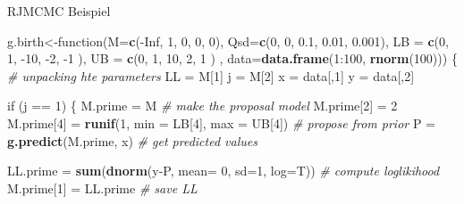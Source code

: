 \documentclass[ignorenonframetext,]{beamer}
\newenvironment{Shaded}{\begin{snugshade}}{\end{snugshade}}
\newcommand{\KeywordTok}[1]{\textcolor[rgb]{0.13,0.29,0.53}{\textbf{{#1}}}}
\newcommand{\DataTypeTok}[1]{\textcolor[rgb]{0.13,0.29,0.53}{{#1}}}
\newcommand{\DecValTok}[1]{\textcolor[rgb]{0.00,0.00,0.81}{{#1}}}
\newcommand{\FloatTok}[1]{\textcolor[rgb]{0.00,0.00,0.81}{{#1}}}
\newcommand{\StringTok}[1]{\textcolor[rgb]{0.31,0.60,0.02}{{#1}}}
\newcommand{\CommentTok}[1]{\textcolor[rgb]{0.56,0.35,0.01}{\textit{{#1}}}}
\newcommand{\OtherTok}[1]{\textcolor[rgb]{0.56,0.35,0.01}{{#1}}}
\newcommand{\NormalTok}[1]{{#1}}
\begin{document}
\begin{frame}{RJMCMC Beispiel}
\begin{Shaded}
\begin{Highlighting}[]
\NormalTok{g.birth<-function(}\DataTypeTok{M=}\KeywordTok{c}\NormalTok{(-}\OtherTok{Inf}\NormalTok{, }\DecValTok{1}\NormalTok{, }\DecValTok{0}\NormalTok{, }\DecValTok{0}\NormalTok{, }\DecValTok{0}\NormalTok{), }\DataTypeTok{Qsd=}\KeywordTok{c}\NormalTok{(}\DecValTok{0}\NormalTok{, }\DecValTok{0}\NormalTok{, }\FloatTok{0.1}\NormalTok{, }\FloatTok{0.01}\NormalTok{, }\FloatTok{0.001}\NormalTok{), }\DataTypeTok{LB =} \KeywordTok{c}\NormalTok{(}\DecValTok{0}\NormalTok{, }\DecValTok{1}\NormalTok{, -}\DecValTok{10}\NormalTok{, -}\DecValTok{2}\NormalTok{, -}\DecValTok{1} \NormalTok{), }\DataTypeTok{UB =} \KeywordTok{c}\NormalTok{(}\DecValTok{0}\NormalTok{, }\DecValTok{1}\NormalTok{, }\DecValTok{10}\NormalTok{, }\DecValTok{2}\NormalTok{, }\DecValTok{1} \NormalTok{)  , }\DataTypeTok{data=}\KeywordTok{data.frame}\NormalTok{(}\DecValTok{1}\NormalTok{:}\DecValTok{100}\NormalTok{, }\KeywordTok{rnorm}\NormalTok{(}\DecValTok{100}\NormalTok{)))}
\NormalTok{\{}
\CommentTok{# unpacking hte parameters}
\NormalTok{LL    =}\StringTok{ }\NormalTok{M[}\DecValTok{1}\NormalTok{]}
\NormalTok{j     =}\StringTok{ }\NormalTok{M[}\DecValTok{2}\NormalTok{]}
\NormalTok{x     =}\StringTok{ }\NormalTok{data[,}\DecValTok{1}\NormalTok{]}
\NormalTok{y     =}\StringTok{ }\NormalTok{data[,}\DecValTok{2}\NormalTok{]}

\NormalTok{if (j ==}\StringTok{ }\DecValTok{1}\NormalTok{)}
\NormalTok{\{}
\NormalTok{M.prime =}\StringTok{ }\NormalTok{M                                           }\CommentTok{# make the proposal model}
\NormalTok{M.prime[}\DecValTok{2}\NormalTok{] =}\StringTok{ }\DecValTok{2}
\NormalTok{M.prime[}\DecValTok{4}\NormalTok{] =}\StringTok{ }\KeywordTok{runif}\NormalTok{(}\DecValTok{1}\NormalTok{, }\DataTypeTok{min =} \NormalTok{LB[}\DecValTok{4}\NormalTok{], }\DataTypeTok{max =} \NormalTok{UB[}\DecValTok{4}\NormalTok{])       }\CommentTok{# propose from prior}
\NormalTok{P =}\StringTok{ }\KeywordTok{g.predict}\NormalTok{(M.prime, x)                             }\CommentTok{# get predicted values}

\NormalTok{LL.prime =}\StringTok{ }\KeywordTok{sum}\NormalTok{(}\KeywordTok{dnorm}\NormalTok{(y-P, }\DataTypeTok{mean=} \DecValTok{0}\NormalTok{, }\DataTypeTok{sd=}\DecValTok{1}\NormalTok{, }\DataTypeTok{log=}\NormalTok{T))      }\CommentTok{# compute loglikihood}
\NormalTok{M.prime[}\DecValTok{1}\NormalTok{] =}\StringTok{ }\NormalTok{LL.prime                                 }\CommentTok{# save LL}


\end{Highlighting}
\end{Shaded}
\end{frame}
\end{document}
